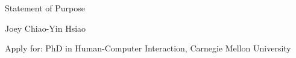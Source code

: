 \documentclass[12pt, a4paper]{article}
\begin{document}
\begin{center}
{\Large Statement of Purpose}
\end{center}

\hfill Joey Chiao-Yin Hsiao
\spacedhrule{0.5em}{0.5em} %

\noindent Apply for: PhD in Human-Computer Interaction, Carnegie Mellon University \\
















 











%
%
%
%
%
%




\end{document}
